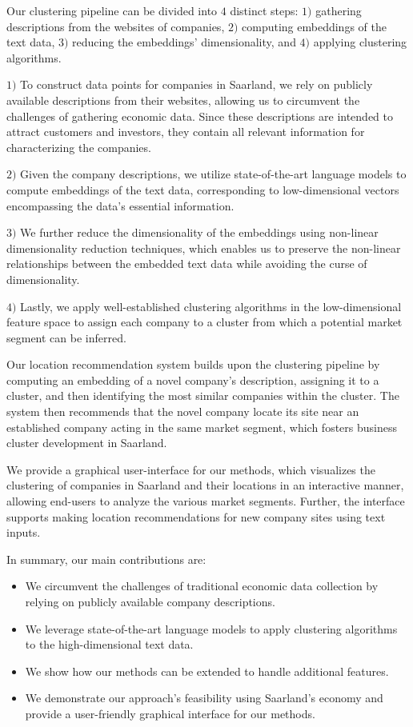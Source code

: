 \documentclass[conference]{IEEEtran}
\begin{document}
Our clustering pipeline can be divided into $4$ distinct steps: $1)$ gathering descriptions from the websites of companies, $2)$ computing embeddings of the text data, $3)$ reducing the embeddings' dimensionality, and $4)$ applying clustering algorithms.

$1)$ To construct data points for companies in Saarland, we rely on publicly available descriptions from their websites, allowing us to circumvent the challenges of gathering economic data. Since these descriptions are intended to attract customers and investors, they contain all relevant information for characterizing the companies.

$2)$ Given the company descriptions, we utilize state-of-the-art language models to compute embeddings of the text data, corresponding to low-dimensional vectors encompassing the data's essential information. 

$3)$ We further reduce the dimensionality of the embeddings using non-linear dimensionality reduction techniques, which enables us to preserve the non-linear relationships between the embedded text data while avoiding the curse of dimensionality. 

$4)$ Lastly, we apply well-established clustering algorithms in the low-dimensional feature space to assign each company to a cluster from which a potential market segment can be inferred.

Our location recommendation system builds upon the clustering pipeline by computing an embedding of a novel company's description, assigning it to a cluster, and then identifying the most similar companies within the cluster. The system then recommends that the novel company locate its site near an established company acting in the same market segment, which fosters business cluster development in Saarland.

We provide a graphical user-interface for our methods, which visualizes the clustering of companies in Saarland and their locations in an interactive manner, allowing end-users to analyze the various market segments. Further, the interface supports making location recommendations for new company sites using text inputs.

In summary, our main contributions are:
\begin{itemize}
	\item We circumvent the challenges of traditional economic data collection by relying on publicly available company descriptions.
	\item We leverage state-of-the-art language models to apply clustering algorithms to the high-dimensional text data.
	\item We show how our methods can be extended to handle additional features.
	\item We demonstrate our approach's feasibility using Saarland's economy and provide a user-friendly graphical interface for our methods.
\end{itemize}
\end{document}
